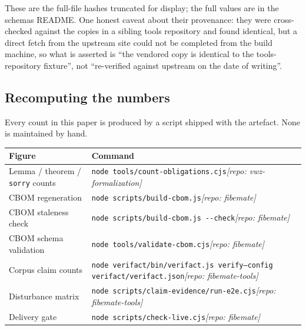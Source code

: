These are the full-file hashes truncated for display; the full values are in the
schemas README. One honest caveat about their provenance: they were
cross-checked against the copies in a sibling tools repository and found
identical, but a direct fetch from the upstream site could not be completed from
the build machine, so what is asserted is ``the vendored copy is identical to
the tools-repository fixture'', not ``re-verified against upstream on the date of
writing''.

\subsection{Recomputing the numbers}

Every count in this paper is produced by a script shipped with the artefact.
None is maintained by hand.

\begin{center}
\begin{tabular}{@{}l>{\raggedright\arraybackslash}p{}@{}}
\toprule
Figure & Command \\
\midrule
Lemma / theorem / \texttt{sorry} counts & \texttt{node tools/count-obligations.cjs}\newline\textit{[repo: vwz-formalization]} \\
CBOM regeneration & \texttt{node scripts/build-cbom.js}\newline\textit{[repo: fibemate]} \\
CBOM staleness check & \texttt{node scripts/build-cbom.js -{}-check}\newline\textit{[repo: fibemate]} \\
CBOM schema validation & \texttt{node tools/validate-cbom.cjs}\newline\textit{[repo: fibemate]} \\
Corpus claim counts & \texttt{node verifact/bin/verifact.js verify}\newline\texttt{--config verifact/verifact.json}\newline\textit{[repo: fibemate-tools]} \\
Disturbance matrix & \texttt{node scripts/claim-evidence/run-e2e.cjs}\newline\textit{[repo: fibemate-tools]} \\
Delivery gate & \texttt{node scripts/check-live.cjs}\newline\textit{[repo: fibemate]} \\
\bottomrule
\end{tabular}
\end{center}

